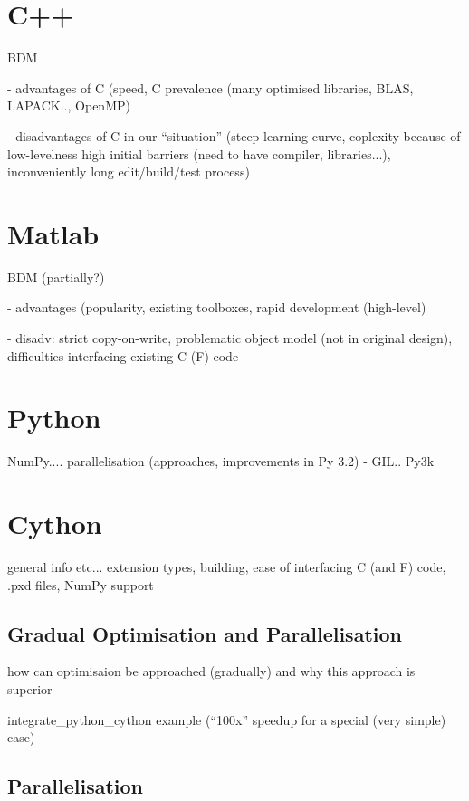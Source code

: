 \documentclass[a4paper,12pt,oneside]{report}
\begin{document}
\section{C++}

BDM

 - advantages of C (speed, C prevalence (many optimised libraries, BLAS, LAPACK.., OpenMP)

 - disadvantages of C in our ``situation'' (steep learning curve, coplexity because of low-levelness
   high initial barriers (need to have compiler, libraries...), inconveniently long edit/build/test
   process)

\section{Matlab}

BDM (partially?)

 - advantages (popularity, existing toolboxes, rapid development (high-level)

 - disadv: strict copy-on-write, problematic object model (not in original design), difficulties
           interfacing existing C (F) code

\section{Python}

NumPy.... parallelisation (approaches, improvements in Py 3.2) - GIL.. Py3k

\section{Cython}

general info etc... extension types, building, ease of interfacing C (and F) code, .pxd files,
NumPy support

\subsection{Gradual Optimisation and Parallelisation}

how can optimisaion be approached (gradually) and why this approach is superior

integrate\_python\_cython example (``100x'' speedup for a special (very simple) case)

\subsection{Parallelisation}
\end{document}
